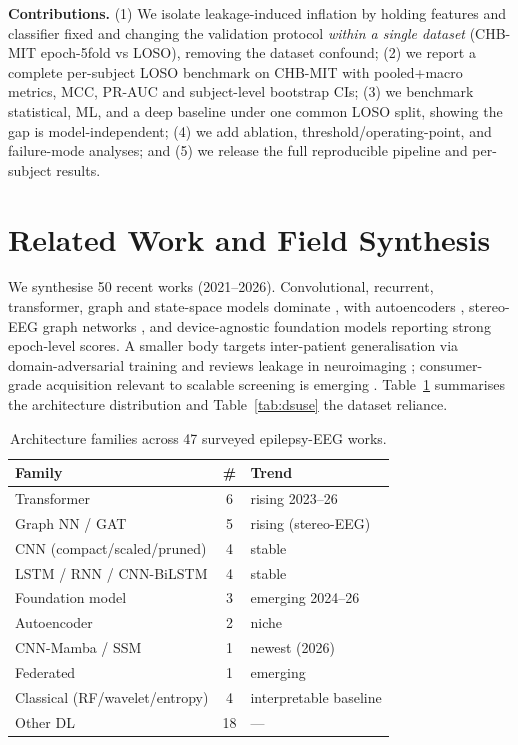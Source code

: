 \documentclass[10pt,journal,twocolumn]{IEEEtran}
\begin{document}
\textbf{Contributions.} (1) We isolate leakage-induced inflation by holding features and classifier fixed and changing the validation protocol \emph{within a single dataset} (CHB-MIT epoch-5fold vs LOSO), removing the dataset confound; (2) we report a complete per-subject LOSO benchmark on CHB-MIT with pooled+macro metrics, MCC, PR-AUC and subject-level bootstrap CIs; (3) we benchmark statistical, ML, and a deep baseline under one common LOSO split, showing the gap is model-independent; (4) we add ablation, threshold/operating-point, and failure-mode analyses; and (5) we release the full reproducible pipeline and per-subject results.

\section{Related Work and Field Synthesis}
We synthesise 50 recent works (2021--2026). Convolutional, recurrent, transformer, graph and state-space models dominate \citep{ep241003385,ep230103470,ep251108861,ep260113234}, with autoencoders \citep{ep250820535}, stereo-EEG graph networks \citep{ep250215198}, and device-agnostic foundation models \citep{ep251108861} reporting strong epoch-level scores. A smaller body targets inter-patient generalisation via domain-adversarial training \citep{ep250515203} and reviews leakage in neuroimaging \citep{ep210203336}; consumer-grade acquisition relevant to scalable screening is emerging \citep{ep251101879,ep220706914}. Table~\ref{tab:arch} summarises the architecture distribution and Table~\ref{tab:dsuse} the dataset reliance.

\begin{table}[h]\centering\caption{Architecture families across 47 surveyed epilepsy-EEG works.}\label{tab:arch}
\begin{tabular}{lcl}\toprule
Family & \# & Trend\\\midrule
Transformer & 6 & rising 2023--26\\
Graph NN / GAT & 5 & rising (stereo-EEG)\\
CNN (compact/scaled/pruned) & 4 & stable\\
LSTM / RNN / CNN-BiLSTM & 4 & stable\\
Foundation model & 3 & emerging 2024--26\\
Autoencoder & 2 & niche\\
CNN-Mamba / SSM & 1 & newest (2026)\\
Federated & 1 & emerging\\
Classical (RF/wavelet/entropy) & 4 & interpretable baseline\\
Other DL & 18 & ---\\\bottomrule
\end{tabular}\end{table}
\end{document}
